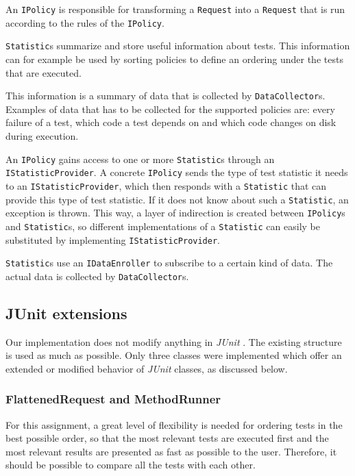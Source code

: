 \documentclass[i2]{oss}
\newcommand{\class}[1]{\texttt{#1}}
\newcommand{\junit}{\emph{JUnit }}
\begin{document}
An \class{IPolicy} is responsible for transforming a \class{Request} into a \class{Request} that is run according to the rules of the \class{IPolicy}. 

\class{Statistic}s summarize and store useful information about tests.
This information can for example be used by sorting policies to define an ordering
under the tests that are executed.

This information is a summary of data that is collected by \class{DataCollector}s.
Examples of data that has to be collected for the supported policies are:
every failure of a test, which code a test depends on and which code 
changes on disk during execution.

An \class{IPolicy} gains access to one or more \class{Statistic}s through
an \class{IStatisticProvider}.
A concrete \class{IPolicy} sends the type of test statistic it needs to an 
\class{IStatisticProvider}, which then responds with a \class{Statistic}
that can provide this type of test statistic. 
If it does not know about such a \class{Statistic}, an exception is thrown.
This way, a layer of indirection is created between \class{IPolicy}s and
\class{Statistic}s, so different implementations of a \class{Statistic} can 
easily be substituted by implementing \class{IStatisticProvider}.

\class{Statistic}s use an \class{IDataEnroller} to subscribe to a certain kind of
data. The actual data is collected by \class{DataCollector}s.


\subsection{JUnit extensions}
\label{subssec:JUnit extensions}

Our implementation does not modify anything in \junit.
The existing structure is used as much as possible.
Only three classes were implemented which offer an extended or modified behavior of \junit classes, as discussed below.

\subsubsection{FlattenedRequest and MethodRunner}

For this assignment, a great level of flexibility is needed for ordering tests in the best possible order, so that the most relevant tests are executed first and the most relevant results are presented as fast as possible to the user.
Therefore, it should be possible to compare all the tests with each other.
\end{document}
